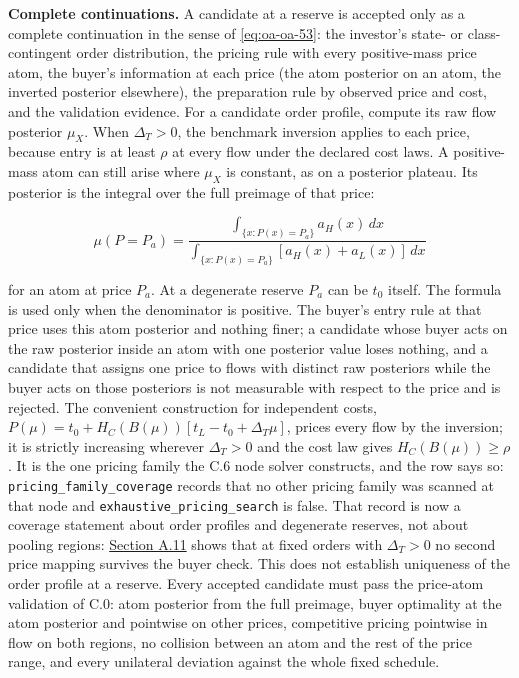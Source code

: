 
\textbf{Complete continuations.} A candidate at a reserve is accepted
only as a complete continuation in the sense of \eqref{eq:oa-oa-53}: the
investor's state- or class-contingent order distribution, the pricing
rule with every positive-mass price atom, the buyer's information at
each price (the atom posterior on an atom, the inverted posterior
elsewhere), the preparation rule by observed price and cost, and the
validation evidence. For a candidate order profile, compute its raw flow
posterior \(\mu_X\). When \(\Delta_T>0\), the benchmark inversion applies to
each price, because entry is at least \(\rho\) at every flow under the
declared cost laws. A positive-mass atom can still arise where \(\mu_X\) is
constant, as on a posterior plateau. Its posterior is the integral over the
full preimage of that price:

\[
\mu(P=P_a)=\frac{\int_{\{x:P(x)=P_a\}}a_H(x)\,dx}
{\int_{\{x:P(x)=P_a\}}[a_H(x)+a_L(x)]\,dx}
\tag{OA.79}\label{eq:oa-oa-79}
\]

for an atom at price \(P_a\). At a degenerate reserve \(P_a\) can be \(t_0\)
itself. The formula is used only when the denominator is positive.
The buyer's entry rule at that price uses this atom posterior and nothing finer; a
candidate whose buyer acts on the raw posterior inside an atom with one
posterior value loses nothing, and a candidate that assigns one price to flows
with distinct raw posteriors while the buyer acts on those posteriors is not
measurable with respect to the price and is rejected. The convenient
construction for independent costs,
\(P(\mu)=t_0+H_C(B(\mu))[t_L-t_0+\Delta_T\mu]\), prices every
flow by the inversion; it is strictly increasing wherever
\(\Delta_T>0\) and the cost law gives \(H_C(B(\mu))\ge\rho\).
It is the one pricing family the C.6 node solver
constructs, and the row says so: \texttt{pricing\_family\_coverage}
records that no other pricing family was scanned at that node and
\texttt{exhaustive\_pricing\_search} is false. That record is now a coverage
statement about order profiles and degenerate reserves, not about pooling
regions: \hyperref[oa-a-pools]{Section A.11} shows that at fixed orders with
\(\Delta_T>0\) no second price mapping survives the buyer check.
This does not establish uniqueness of the order profile at a reserve. Every
accepted candidate must pass the price-atom validation of C.0: atom
posterior from the full preimage, buyer optimality at the atom
posterior and pointwise on other prices, competitive pricing
pointwise in flow on both regions, no collision between an atom and the
rest of the price range, and every unilateral deviation against the whole
fixed schedule.

